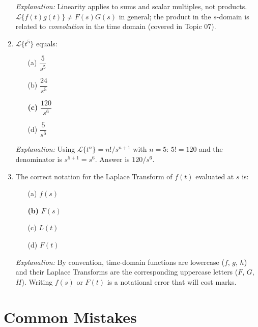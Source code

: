 \documentclass[12pt,a4paper]{article}
\begin{document}
\begin{enumerate}[leftmargin=1.5em, label=\textbf{MCQ \arabic*.}]
\textit{Explanation:} Linearity applies to sums and scalar multiples, not products. $\mathcal{L}\{f(t)g(t)\} \neq F(s)G(s)$ in general; the product in the $s$-domain is related to \emph{convolution} in the time domain (covered in Topic 07).

\item $\mathcal{L}\{t^5\}$ equals:

\begin{itemize}[leftmargin=2em]
  \item[(a)] $\dfrac{5}{s^5}$
  \item[(b)] $\dfrac{24}{s^5}$
  \item[\textbf{(c)}] \textbf{$\dfrac{120}{s^6}$}
  \item[(d)] $\dfrac{5}{s^6}$
\end{itemize}

\textit{Explanation:} Using $\mathcal{L}\{t^n\} = n!/s^{n+1}$ with $n = 5$: $5! = 120$ and the denominator is $s^{5+1} = s^6$. Answer is $120/s^6$.

\item The correct notation for the Laplace Transform of $f(t)$ evaluated at $s$ is:

\begin{itemize}[leftmargin=2em]
  \item[(a)] $f(s)$
  \item[\textbf{(b)}] \textbf{$F(s)$}
  \item[(c)] $L(t)$
  \item[(d)] $F(t)$
\end{itemize}

\textit{Explanation:} By convention, time-domain functions are lowercase ($f$, $g$, $h$) and their Laplace Transforms are the corresponding uppercase letters ($F$, $G$, $H$). Writing $f(s)$ or $F(t)$ is a notational error that will cost marks.

\end{enumerate}

\section{Common Mistakes}
\end{document}
